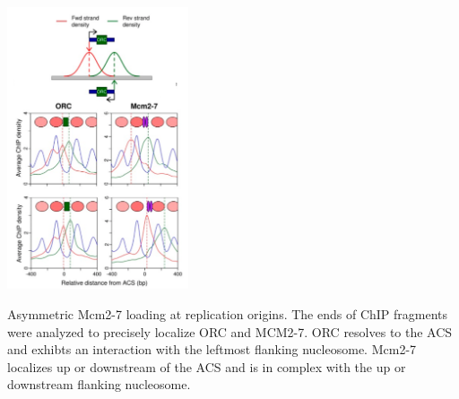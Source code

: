 \begin{floatingfigure}[r]{2.1in}
\vspace{-8mm}
\begin{center}
\includegraphics[width=2.1in]{r35_figures/mcm_histone.png}
\end{center}
\vspace{3mm}
\caption{Asymmetric Mcm2-7 loading at replication origins.  The ends of ChIP fragments were analyzed to precisely localize ORC and MCM2-7.  ORC resolves to the ACS and exhibts an interaction with the leftmost flanking nucleosome.  Mcm2-7 localizes up or downstream of the ACS and is in complex with the up or downstream flanking nucleosome.}%
\end{floatingfigure}%





